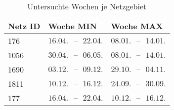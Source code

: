 {
\renewcommand{\arraystretch}{1.2}%
\begin{table}[H]
	\begin{center}
		\caption{Untersuchte Wochen je Netzgebiet}
		\begin{tabu} to 0.6\textwidth {X[0.5] X[1, r] X[1, r]}
			\toprule
			Netz ID	   & Woche MIN                         & Woche MAX                         \\ \midrule
			\num{176}  & \(16.04. \text{ {--} } 22.04.\) & \(08.01. \text{ {--} } 14.01.\) \\
			\num{1056} & \(30.04. \text{ {--} } 06.05.\) & \(08.01. \text{ {--} } 14.01.\) \\
			\num{1690} & \(03.12. \text{ {--} } 09.12.\) & \(29.10. \text{ {--} } 04.11.\) \\
			\num{1811} & \(10.12. \text{ {--} } 16.12.\) & \(24.09. \text{ {--} } 30.09.\) \\
			\num{177}  & \(16.04. \text{ {--} } 22.04.\) & \(10.12. \text{ {--} } 16.12.\) \\ \bottomrule
		\end{tabu}
		\label{tab:extreme_weeks}
	\end{center}
	\vspace{-3mm}%
\end{table}
}